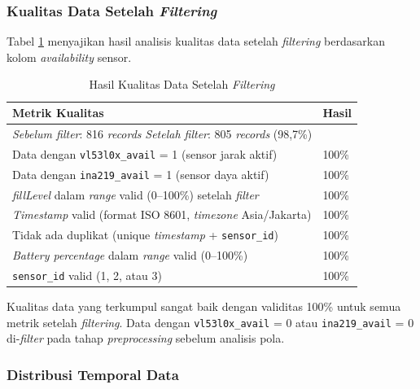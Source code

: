 \subsubsection{Kualitas Data Setelah \textit{Filtering}}

Tabel \ref{tab:kualitas-data} menyajikan hasil analisis kualitas data setelah \textit{filtering} berdasarkan kolom \textit{availability} sensor.

\begin{table}[H]
  \caption{Hasil Kualitas Data Setelah \textit{Filtering}}
  \label{tab:kualitas-data}
  \begin{tabularx}{\textwidth}{| X | l |}
    \hline
    \textbf{Metrik Kualitas} & \textbf{Hasil} \\
    \hline
    \multicolumn{2}{|l|}{\textit{Sebelum filter}: 816 \textit{records} \quad \textit{Setelah filter}: 805 \textit{records} (98,7\%)} \\
    \hline
    Data dengan \texttt{vl53l0x\_avail} = 1 (sensor jarak aktif) & 100\% \\
    \hline
    Data dengan \texttt{ina219\_avail} = 1 (sensor daya aktif) & 100\% \\
    \hline
    \textit{fillLevel} dalam \textit{range} valid (0--100\%) setelah \textit{filter} & 100\% \\
    \hline
    \textit{Timestamp} valid (format ISO 8601, \textit{timezone} Asia/Jakarta) & 100\% \\
    \hline
    Tidak ada duplikat (unique \textit{timestamp} + \texttt{sensor\_id}) & 100\% \\
    \hline
    \textit{Battery percentage} dalam \textit{range} valid (0--100\%) & 100\% \\
    \hline
    \texttt{sensor\_id} valid (1, 2, atau 3) & 100\% \\
    \hline
  \end{tabularx}
\end{table}

Kualitas data yang terkumpul sangat baik dengan validitas 100\% untuk semua metrik setelah \textit{filtering}. Data dengan \texttt{vl53l0x\_avail} = 0 atau \texttt{ina219\_avail} = 0 di-\textit{filter} pada tahap \textit{preprocessing} sebelum analisis pola.

\subsubsection{Distribusi Temporal Data}

